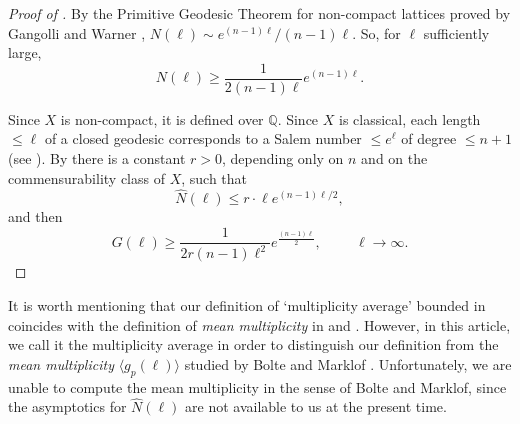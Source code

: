 \documentclass[12pt]{amsart}
\newcommand{\Q}{\mathbb{Q}}
\theoremstyle{plain}
\begin{document}
\begin{proof}[Proof of ]
By the Primitive Geodesic Theorem for non-compact lattices proved by Gangolli and Warner \cite[Prop. 5.4]{GW80}, $N(\ell)\sim e^{(n-1)\ell}/(n-1)\ell$. So, for $\ell$ sufficiently large, \[N(\ell)\geq \frac{1}{2(n-1)\ell}e^{(n-1)\ell}.\]

Since $X$ is non-compact, it is defined over $\Q$. Since $X$ is classical, each length $\leq\ell$ of a closed geodesic corresponds to a Salem number $\leq e^\ell$ of degree $\leq n+1$ (see ). By  there is a constant $r>0$, depending only on $n$ and on the commensurability class of $X$, such that \[\widehat{N}(\ell)\leq r\cdot \ell e^{(n-1)\ell/2},\]
and then
\[G(\ell)\geq \frac{1}{2r(n-1)\ell^2}e^{\frac{(n-1)\ell}{2}}, \hspace{1cm}\ell\to\infty.\] 
\end{proof}

It is worth mentioning that our definition of `multiplicity average' bounded in  coincides with the definition of \emph{mean multiplicity} in \cite{BLMT22} and \cite{G24}. However, in this article, we call it the multiplicity average in order to distinguish our definition from the \emph{mean multiplicity} $\langle g_p(\ell)\rangle$ studied by Bolte \cite{B93} and Marklof \cite{M96}. 
Unfortunately, we are unable to compute the mean multiplicity in the sense of Bolte and Marklof, since the asymptotics for $\widehat{N}(\ell)$ are not available to us at the present time. 




\end{document}
